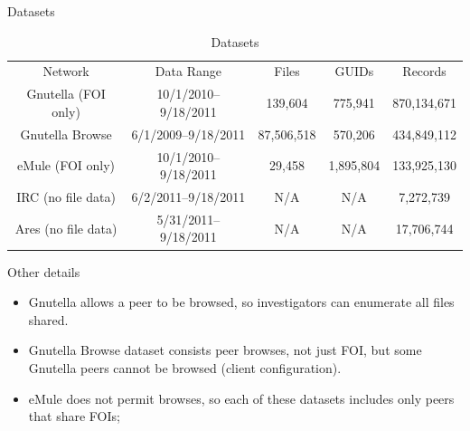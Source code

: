 \documentclass[notes]{beamer}
\begin{document}
\begin{frame}

\begin{block}{Datasets}

\begin{table}[H]
\begin{small} 
\setlength{\tabcolsep}{0.1pt} 
\centering

\caption{Datasets} 
\label{tab:table1}
\begin{tabular}{|c|c|c|c|c|}\hline \\

\hline 

Network & Data Range & Files & GUIDs & Records \\ 

\hline
\hline
Gnutella (FOI only) & 10/1/2010–9/18/2011 & 139,604 & 775,941 & 870,134,671 \\
Gnutella Browse & 6/1/2009–9/18/2011 & 87,506,518 & 570,206 & 434,849,112 \\
eMule (FOI only) & 10/1/2010–9/18/2011 & 29,458 & 1,895,804 & 133,925,130 \\
IRC (no file data) & 6/2/2011–9/18/2011 & N/A & N/A & 7,272,739 \\
Ares (no file data) & 5/31/2011–9/18/2011 & N/A & N/A & 17,706,744\\

\hline
\end{tabular}
\end{small}
\end{table} 

\end{block}

\end{frame}

\begin{frame}

\begin{block}{Other details}

\begin{itemize}

\item[\checkmark]Gnutella allows a peer to be browsed, so investigators can enumerate all files shared.

\item[\checkmark]Gnutella Browse dataset consists peer browses, not just FOI, but some Gnutella peers cannot be browsed (client configuration).

\item[\checkmark]eMule does not permit browses, so each of these datasets includes only peers that share FOIs;

\end{itemize}

\end{block}

\end{frame}
\end{document}
